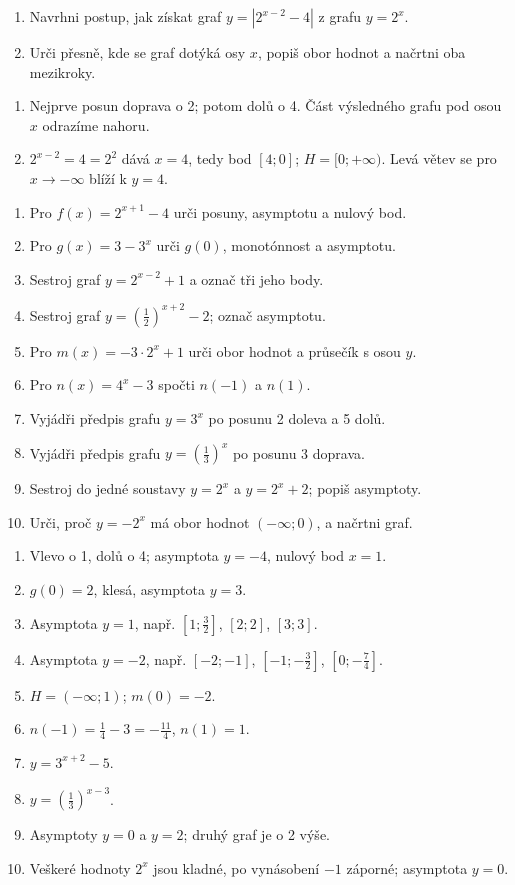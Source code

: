 \documentclass[11pt,a4paper]{article}
\begin{document}
\begin{zadaniReseniBox}[title={Rozšíření 2}]
\begin{enumerate}[label=\alph*)]
\item Navrhni postup, jak získat graf $y=\left|2^{x-2}-4\right|$ z grafu $y=2^x$.
\item Urči přesně, kde se graf dotýká osy $x$, popiš obor hodnot a načrtni oba mezikroky.
\end{enumerate}
\tcblower
\begin{enumerate}[label=\alph*)]
\item Nejprve posun doprava o 2; potom dolů o 4. Část výsledného grafu pod osou $x$ odrazíme nahoru.
\item $2^{x-2}=4=2^2$ dává $x=4$, tedy bod $[4;0]$; $H=[0;+\infty)$. Levá větev se pro $x\to-\infty$ blíží k $y=4$.
\end{enumerate}
\end{zadaniReseniBox}
\begin{zadaniReseniBox}[title={Domácí úkol}]
\begin{enumerate}[label=\alph*)]
\item Pro $f(x)=2^{x+1}-4$ urči posuny, asymptotu a nulový bod.
\item Pro $g(x)=3-3^x$ urči $g(0)$, monotónnost a asymptotu.
\item Sestroj graf $y=2^{x-2}+1$ a označ tři jeho body.
\item Sestroj graf $y=\left(\frac{1}{2}\right)^{x+2}-2$; označ asymptotu.
\item Pro $m(x)=-3\cdot2^x+1$ urči obor hodnot a průsečík s osou $y$.
\item Pro $n(x)=4^x-3$ spočti $n(-1)$ a $n(1)$.
\item Vyjádři předpis grafu $y=3^x$ po posunu 2 doleva a 5 dolů.
\item Vyjádři předpis grafu $y=\left(\frac{1}{3}\right)^x$ po posunu 3 doprava.
\item Sestroj do jedné soustavy $y=2^x$ a $y=2^x+2$; popiš asymptoty.
\item Urči, proč $y=-2^x$ má obor hodnot $(-\infty;0)$, a načrtni graf.
\end{enumerate}
\tcblower
\begin{enumerate}[label=\alph*)]
\item Vlevo o 1, dolů o 4; asymptota $y=-4$, nulový bod $x=1$.
\item $g(0)=2$, klesá, asymptota $y=3$.
\item Asymptota $y=1$, např. $[1;\frac{3}{2}]$, $[2;2]$, $[3;3]$.
\item Asymptota $y=-2$, např. $[-2;-1]$, $[-1;-\frac{3}{2}]$, $[0;-\frac{7}{4}]$.
\item $H=(-\infty;1)$; $m(0)=-2$.
\item $n(-1)=\frac{1}{4}-3=-\frac{11}{4}$, $n(1)=1$.
\item $y=3^{x+2}-5$.
\item $y=\left(\frac{1}{3}\right)^{x-3}$.
\item Asymptoty $y=0$ a $y=2$; druhý graf je o 2 výše.
\item Veškeré hodnoty $2^x$ jsou kladné, po vynásobení $-1$ záporné; asymptota $y=0$.
\end{enumerate}
\end{zadaniReseniBox}
\end{document}
